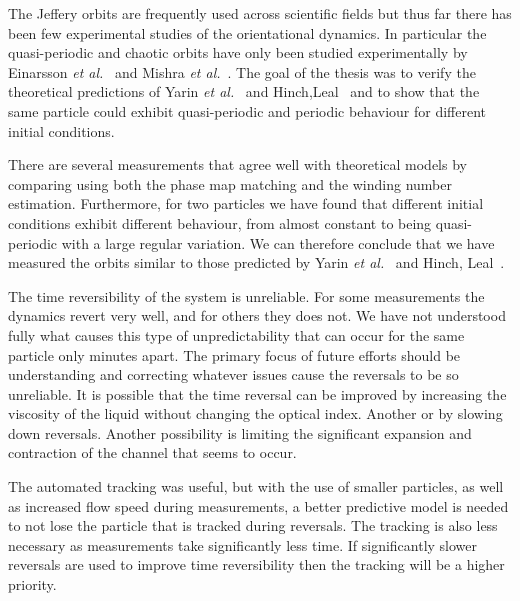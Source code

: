 The Jeffery orbits are frequently used across scientific fields but thus far there has been few experimental studies 
of the orientational dynamics. In particular the quasi-periodic and chaotic orbits have only been studied experimentally
by Einarsson \emph{et al.}~\cite{JonasExperiment} and Mishra \emph{et al.}~\cite{Mishra}.
The goal of the thesis was to verify the theoretical predictions of Yarin \emph{et al.}~\cite{Yarin} and Hinch,Leal~\cite{Leal} and to show that the same particle could exhibit quasi-periodic and periodic behaviour for different initial conditions.


There are several measurements that agree well with theoretical models by comparing using both the phase map matching and the winding number estimation. Furthermore, for two particles we have found that different initial conditions exhibit different behaviour, 
from almost constant to being quasi-periodic with a large regular variation. We can therefore conclude that we have measured the
orbits similar to those predicted by Yarin \emph{et al.}~\cite{Yarin} and Hinch, Leal~\cite{Leal}.

The time reversibility of the system is unreliable. For some measurements the dynamics revert very well, and for others they does not. 
We have not understood fully what causes this type of unpredictability that can occur for the same particle only 
minutes apart. The primary focus of future efforts should be understanding and correcting whatever issues cause the 
reversals to be so unreliable. It is possible that the time reversal can be improved by increasing the viscosity of the liquid
without changing the optical index. Another or by slowing down reversals. Another possibility is limiting the 
significant expansion and contraction of the channel that seems to occur.

The automated tracking was useful, but with the use of smaller particles, as well as increased flow speed during measurements, 
a better predictive model is needed to not lose the particle that is tracked during reversals. The tracking is also less necessary as
measurements take significantly less time. If significantly slower reversals are used to improve
time reversibility then the tracking will be a higher priority.